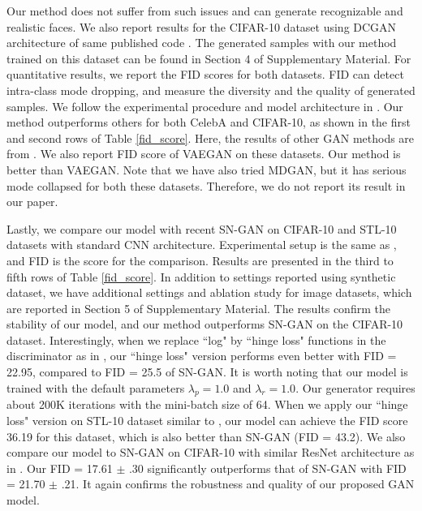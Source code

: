 \documentclass[runningheads]{llncs}
\begin{document}
Our method does not suffer from such issues and can generate recognizable and realistic faces.
We also report  results for the CIFAR-10 dataset using DCGAN architecture \cite{radford-arxiv-2015} of same published code \cite{gulrajani-arxiv-2017}. The generated samples with our method trained on this dataset can be found in Section 4 of Supplementary Material. For quantitative results, we report the FID scores \cite{heusel-arxiv-2017} for both datasets. FID can detect intra-class mode dropping, and measure the diversity and the quality of generated samples. We follow the experimental procedure and model architecture in \cite{lucic-2017-arxiv}.
Our method outperforms others for both CelebA and CIFAR-10, as shown in the first and second rows of Table \ref{fid_score}. Here, the results of other GAN methods are from \cite{lucic-2017-arxiv}. We also report FID score of VAEGAN on these datasets. Our method is better than VAEGAN. Note that we have also tried MDGAN, but it has serious mode collapsed for both these datasets. Therefore, we do not report its result in our paper. 

Lastly, we compare our model with recent SN-GAN \cite{miyato-iclr-2018} on CIFAR-10 and STL-10 datasets with standard CNN architecture. Experimental setup is the same as \cite{miyato-iclr-2018}, and FID is the score for the comparison. Results are presented in the  third to fifth rows of Table \ref{fid_score}. In addition to settings reported using synthetic dataset, we have additional settings and ablation study for image datasets, which are reported in Section 5 of Supplementary Material. The results confirm the stability of our model, and our method outperforms SN-GAN on the CIFAR-10 dataset. Interestingly, when we replace ``log" by ``hinge loss" functions in the discriminator as in \cite{miyato-iclr-2018}, our ``hinge loss" version performs even better with FID = 22.95, compared to FID = 25.5 of SN-GAN. It is worth noting that our model is trained with the default parameters $\lambda_p = 1.0$ and $\lambda_r = 1.0$. Our generator requires about 200K iterations with the mini-batch size of 64. When we apply our ``hinge loss" version on STL-10 dataset similar to \cite{miyato-iclr-2018}, our model can achieve the FID score 36.19 for this dataset, which is also better than SN-GAN (FID = 43.2). We also compare our model to SN-GAN on CIFAR-10 with similar ResNet architecture as in \cite{miyato-iclr-2018}. Our FID = 17.61 $\pm$ .30 significantly outperforms that of SN-GAN with FID = 21.70 $\pm$ .21. It again confirms the robustness and quality of our proposed GAN model.
\end{document}
